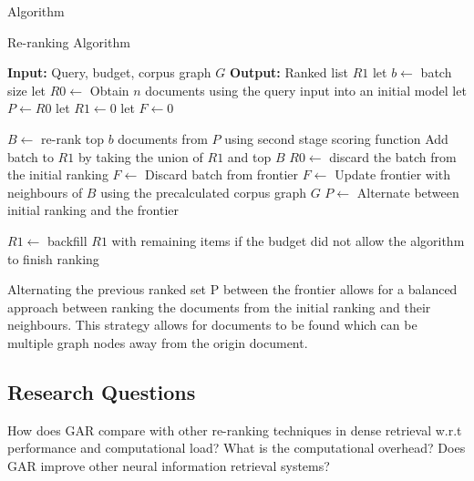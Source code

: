 \documentclass[sigconf,authorversion,nonacm]{acmart}
\begin{document}
Algorithm
\begin{algorithm}
	\caption{Re-ranking Algorithm}
	\begin{algorithmic}[1]
		\STATE \textbf{Input:} Query, budget, corpus graph \(G\)
		\STATE \textbf{Output:} Ranked list \(R1\)
		\STATE let \(b \leftarrow\) batch size
		\STATE let \(R0 \leftarrow\) Obtain \(n\) documents using the query input into an initial model
		\STATE let \(P \leftarrow R0\)
		\STATE let \(R1 \leftarrow 0\)
		\STATE let \(F \leftarrow 0\)

		\STATE \(B \leftarrow\) re-rank top \(b\) documents from \(P\) using second stage scoring function
		\STATE Add batch to \(R1\) by taking the union of \(R1\) and top \(B\)
		\STATE \(R0 \leftarrow\) discard the batch from the initial ranking
		\STATE \(F \leftarrow\) Discard batch from frontier
		\STATE \(F \leftarrow\) Update frontier with neighbours of \(B\) using the precalculated corpus graph \(G\)
		\STATE \(P \leftarrow\) Alternate between initial ranking and the frontier
		\ENDWHILE

		\STATE \(R1 \leftarrow\) backfill \(R1\) with remaining items if the budget did not allow the algorithm to finish ranking
	\end{algorithmic}
\end{algorithm}

Alternating the previous ranked set P between the frontier allows for a balanced approach between
ranking the documents from the initial ranking and their neighbours. This strategy allows for
documents to be found which can be multiple graph nodes away from the origin document.
\subsection{Research Questions}

How does GAR compare with other re-ranking techniques in dense retrieval w.r.t performance and
computational load?
What is the computational overhead?
Does GAR improve other neural information retrieval systems?

\end{document}

